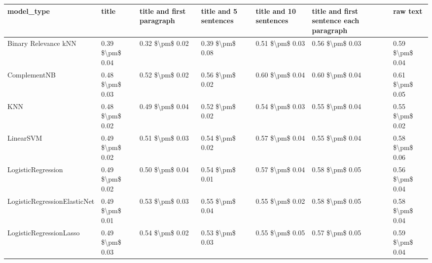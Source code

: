 \begin{tabular}{lllllll}
\toprule
                     model\_type &           title & title and first paragraph & title and 5 sentences & title and 10 sentences & title and first sentence each paragraph &            raw text \\
\midrule
           Binary Relevance kNN & 0.39 \$\textbackslash pm\$ 0.04 &           0.32 \$\textbackslash pm\$ 0.02 &       0.39 \$\textbackslash pm\$ 0.08 &        0.51 \$\textbackslash pm\$ 0.03 &                         0.56 \$\textbackslash pm\$ 0.03 &     0.59 \$\textbackslash pm\$ 0.04 \\
                   ComplementNB & 0.48 \$\textbackslash pm\$ 0.03 &           0.52 \$\textbackslash pm\$ 0.02 &       0.56 \$\textbackslash pm\$ 0.02 &        0.60 \$\textbackslash pm\$ 0.04 &                         0.60 \$\textbackslash pm\$ 0.04 &     0.61 \$\textbackslash pm\$ 0.05 \\
                            KNN & 0.48 \$\textbackslash pm\$ 0.02 &           0.49 \$\textbackslash pm\$ 0.04 &       0.52 \$\textbackslash pm\$ 0.02 &        0.54 \$\textbackslash pm\$ 0.03 &                         0.55 \$\textbackslash pm\$ 0.04 &     0.55 \$\textbackslash pm\$ 0.02 \\
                      LinearSVM & 0.49 \$\textbackslash pm\$ 0.02 &           0.51 \$\textbackslash pm\$ 0.03 &       0.54 \$\textbackslash pm\$ 0.02 &        0.57 \$\textbackslash pm\$ 0.04 &                         0.55 \$\textbackslash pm\$ 0.04 &     0.58 \$\textbackslash pm\$ 0.06 \\
             LogisticRegression & 0.49 \$\textbackslash pm\$ 0.02 &           0.50 \$\textbackslash pm\$ 0.04 &       0.54 \$\textbackslash pm\$ 0.01 &        0.57 \$\textbackslash pm\$ 0.04 &                         0.58 \$\textbackslash pm\$ 0.05 &     0.56 \$\textbackslash pm\$ 0.04 \\
   LogisticRegressionElasticNet & 0.49 \$\textbackslash pm\$ 0.01 &           0.53 \$\textbackslash pm\$ 0.03 &       0.55 \$\textbackslash pm\$ 0.04 &        0.55 \$\textbackslash pm\$ 0.02 &                         0.58 \$\textbackslash pm\$ 0.05 &     0.58 \$\textbackslash pm\$ 0.04 \\
        LogisticRegressionLasso & 0.49 \$\textbackslash pm\$ 0.03 &           0.54 \$\textbackslash pm\$ 0.02 &       0.53 \$\textbackslash pm\$ 0.03 &        0.55 \$\textbackslash pm\$ 0.05 &                         0.57 \$\textbackslash pm\$ 0.05 &     0.59 \$\textbackslash pm\$ 0.04 \\

\end{tabular}
